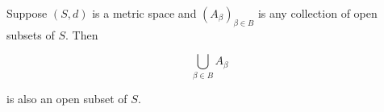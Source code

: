 Suppose $(S, d)$ is a metric space and $(A_{\beta})_{\beta \in B}$ is any collection of open subsets of $S$. Then

$$\bigcup_{\beta \in B} A_{\beta}$$

is also an open subset of $S$.
